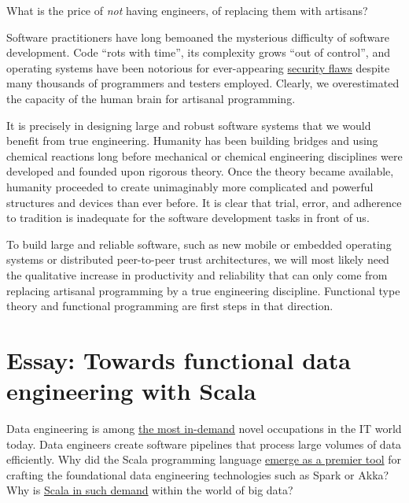 What is the price of \emph{not} having engineers, of replacing them
with artisans?

Software practitioners have long bemoaned the mysterious difficulty
of software development. Code ``rots with time'', its complexity
grows ``out of control'', and operating systems have been notorious
for ever-appearing \href{https://www.techrepublic.com/article/a-malicious-usb-stick-could-crash-your-windows-pc-even-if-its-locked/}{security flaws}
despite many thousands of programmers and testers employed. Clearly,
we overestimated the capacity of the human brain for artisanal programming.

It is precisely in designing large and robust software systems that
we would benefit from true engineering. Humanity has been building
bridges and using chemical reactions long before mechanical or chemical
engineering disciplines were developed and founded upon rigorous theory.
Once the theory became available, humanity proceeded to create unimaginably
more complicated and powerful structures and devices than ever before.
It is clear that trial, error, and adherence to tradition is inadequate
for the software development tasks in front of us. 

To build large and reliable software, such as new mobile or embedded
operating systems or distributed peer-to-peer trust architectures,
we will most likely need the qualitative increase in productivity
and reliability that can only come from replacing artisanal programming
by a true engineering discipline. Functional type theory and functional
programming are first steps in that direction.

\chapter{Essay: Towards functional data engineering with Scala}

Data engineering is among \href{https://www.forbes.com/sites/louiscolumbus/2017/05/13/ibm-predicts-demand-for-data-scientists-will-soar-28-by-2020/}{the most in-demand}
novel occupations in the IT world today. Data engineers create software
pipelines that process large volumes of data efficiently. Why did
the Scala programming language \href{https://www.slideshare.net/noootsab/scala-the-unpredicted-lingua-franca-for-data-science}{emerge as a premier tool}
for crafting the foundational data engineering technologies such as
Spark or Akka? Why is \href{https://techcrunch.com/2016/06/14/scala-is-the-new-golden-child/}{Scala in such demand}
within the world of big data?

